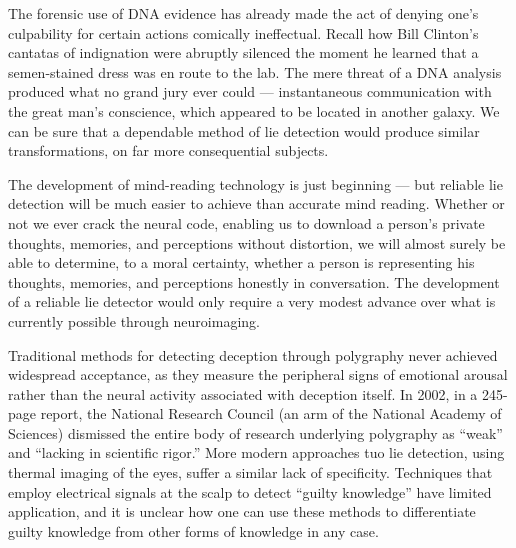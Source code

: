 \documentclass[a4paper,14pt]{extbook}
\begin{document}
The forensic use of DNA evidence has already made the act of denying one’s culpability for certain actions comically ineffectual.
Recall how Bill Clinton’s cantatas of indignation were abruptly silenced the moment he learned that a semen-stained dress was en route to the lab.
The mere threat of a DNA analysis produced what no grand jury ever could --- instantaneous communication with the great man’s conscience, which appeared to be located in another galaxy.
We can be sure that a dependable method of lie detection would produce similar transformations, on far more consequential subjects.

The development of mind-reading technology is just beginning --- but reliable lie detection will be much easier to achieve than accurate mind reading.
Whether or not we ever crack the neural code, enabling us to download a person’s private thoughts, memories, and perceptions without distortion, we will almost surely be able to determine, to a moral certainty, whether a person is representing his thoughts, memories, and perceptions honestly in conversation.
The development of a reliable lie detector would only require a very modest advance over what is currently possible through neuroimaging.

Traditional methods for detecting deception through polygraphy never achieved widespread acceptance, as they measure the peripheral signs of emotional arousal rather than the neural activity associated with deception itself.
In 2002, in a 245-page report, the National Research Council (an arm of the National Academy of Sciences) dismissed the entire body of research underlying polygraphy as ``weak'' and ``lacking in scientific rigor.''
More modern approaches tuo lie detection, using thermal imaging of the eyes, suffer a similar lack of specificity.
Techniques that employ electrical signals at the scalp to detect ``guilty knowledge'' have limited application, and it is unclear how one can use these methods to differentiate guilty knowledge from other forms of knowledge in any case.
\end{document}

